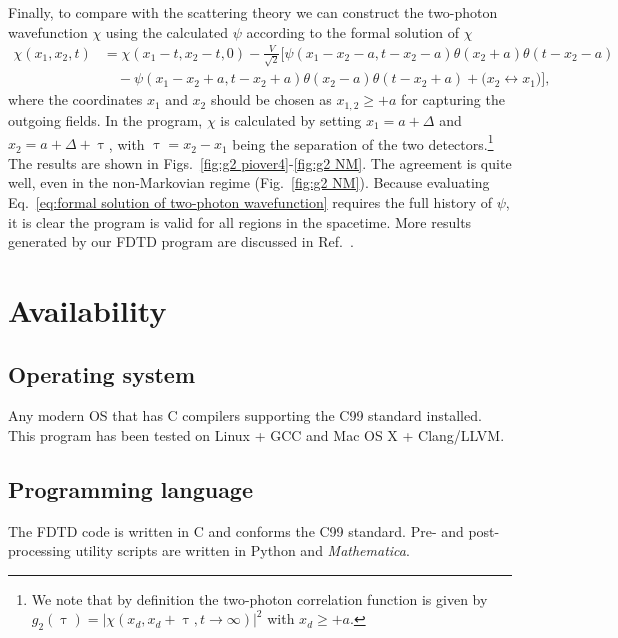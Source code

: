 \documentclass[12pt,letter,onecolumn,notitlepage]{article}
\begin{document}
Finally, to compare with the scattering theory we can construct the two-photon wavefunction $\chi$ using the calculated $\psi$ according to the formal solution of $\chi$
\begin{align}
\chi(x_1, x_2, t)& = \chi(x_1-t, x_2-t, 0)-\frac{V}{\sqrt{2}}\biggl[
\psi(x_1-x_2-a, t-x_2-a)\theta(x_2+a)\theta(t-x_2-a)\nonumber\\
&\quad
-\psi(x_1-x_2+a, t-x_2+a)\theta(x_2-a)\theta(t-x_2+a) +\bigl(x_2 \leftrightarrow x_1\bigr)
\biggr],
\label{eq:formal solution of two-photon wavefunction}
\end{align}
where the coordinates $x_1$ and $x_2$ should be chosen as $x_{1,2}\geq +a$ for capturing the outgoing fields. In the program, $\chi$ is calculated by setting $x_1=a+\Delta$ and $x_2=a+\Delta+\uptau$, with $\uptau=x_2-x_1$ being the separation of the two detectors.\footnote{We note that by definition the two-photon correlation function is given by $g_2(\uptau) = |\chi(x_d, x_d+\uptau, t\rightarrow\infty)|^2$ with $x_d\geq+a$.} The results are shown in Figs.~\ref{fig:g2 piover4}-\ref{fig:g2 NM}. The agreement is quite well, even in the non-Markovian regime (Fig.~\ref{fig:g2 NM}). Because evaluating Eq.~\eqref{eq:formal solution of two-photon wavefunction} requires the full history of $\psi$, it is clear the program is valid for all regions in the spacetime.
More results generated by our FDTD program are discussed in Ref.~\cite{FangNM17}. 

\section{Availability}
\subsection{Operating system}
Any modern OS that has C compilers supporting the C99 standard installed. This program has been tested on Linux + GCC and Mac OS X + Clang/LLVM.

\subsection{Programming language}
The FDTD code is written in C and conforms the C99 standard. Pre- and post-processing utility scripts are written in Python and \textit{Mathematica}.
 
\end{document}

